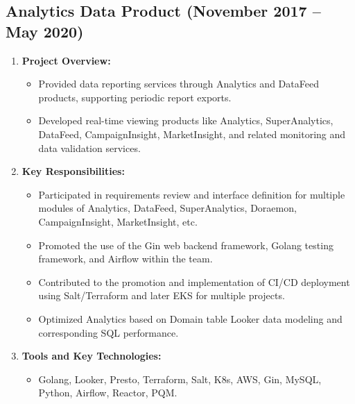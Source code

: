 \documentclass{resume}
\begin{document}
\subsection*{Analytics Data Product (November 2017 -- May 2020)}
\begin{enumerate}
    \item \textbf{Project Overview:}
    \begin{itemize}
        \item Provided data reporting services through Analytics and DataFeed products, supporting periodic report exports.
        \item Developed real-time viewing products like Analytics, SuperAnalytics, DataFeed, CampaignInsight, MarketInsight, and related monitoring and data validation services.
    \end{itemize}

    \item \textbf{Key Responsibilities:}
    \begin{itemize}
        \item Participated in requirements review and interface definition for multiple modules of Analytics, DataFeed, SuperAnalytics, Doraemon, CampaignInsight, MarketInsight, etc.
        \item Promoted the use of the Gin web backend framework, Golang testing framework, and Airflow within the team.
        \item Contributed to the promotion and implementation of CI/CD deployment using Salt/Terraform and later EKS for multiple projects.
        \item Optimized Analytics based on Domain table Looker data modeling and corresponding SQL performance.
    \end{itemize}

    \item \textbf{Tools and Key Technologies:}
    \begin{itemize}
        \item Golang, Looker, Presto, Terraform, Salt, K8s, AWS, Gin, MySQL, Python, Airflow, Reactor, PQM.
    \end{itemize}


\end{enumerate}
\end{document}
